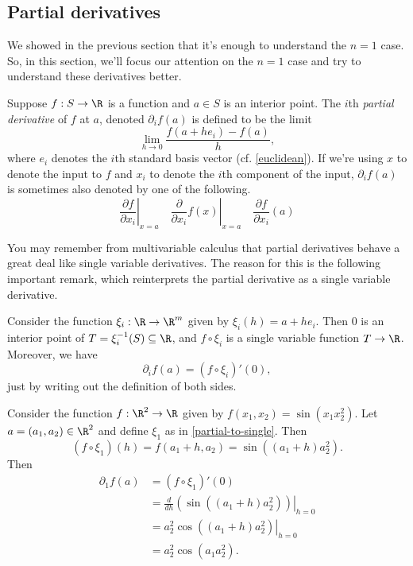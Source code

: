 \subsection{Partial derivatives}

We showed in the previous section that it's enough to understand the $n = 1$ case. So, in this section, we'll focus our attention on the $n = 1$ case and try to understand these derivatives better. 

\begin{definition}
	Suppose $f : S \to \R$ is a function and $a \in S$ is an interior point. The $i$th \emph{partial derivative} of $f$ at $a$, denoted $\partial_i f(a)$ is defined to be the limit
	\[ \lim_{h \to 0} \frac{f(a+he_i) - f(a)}{h}, \]
	where $e_i$ denotes the $i$th standard basis vector (cf. \cref{euclidean}). If we're using $x$ to denote the input to $f$ and $x_i$ to denote the $i$th component of the input, $\partial_i f(a)$ is sometimes also denoted by one of the following. 
	\[ \left. \frac{\partial f}{\partial x_i}\right|_{x = a} \quad \left.\frac{\partial}{\partial x_i} f(x)\right|_{x = a} \quad \frac{\partial f}{\partial x_i}(a) \]
\end{definition}

You may remember from multivariable calculus that partial derivatives behave a great deal like single variable derivatives. The reason for this is the following important remark, which reinterprets the partial derivative as a single variable derivative. 

\begin{remark} \label{partial-to-single}
	Consider the function $\xi_i : \R \to \R^m$ given by $\xi_i(h) = a + he_i$. Then 0 is an interior point of $T = \xi_i^{-1}(S) \subseteq \R$, and $f \circ \xi_i$ is a single variable function $T \to \R$. Moreover, we have
	\[ \partial_i f(a) = (f \circ \xi_i)'(0), \]
	just by writing out the definition of both sides. 
\end{remark}

\begin{example} \label{computing-partials-example}
	Consider the function $f : \R^2 \to \R$ given by $f(x_1, x_2) = \sin(x_1x_2^2)$. Let $a = (a_1, a_2) \in \R^2$ and define $\xi_1$ as in \cref{partial-to-single}. Then
	\[ (f \circ \xi_1)(h) = f(a_1 + h, a_2) = \sin((a_1+h)a_2^2).  \]
	Then
	\[ \begin{aligned} \partial_1 f(a) &= (f \circ \xi_1)'(0) \\
	&= \left.\frac{d}{dh} \left(\sin((a_1+h)a_2^2) \right) \right|_{h = 0} \\
	&= \left. a_2^2\cos((a_1+h)a_2^2)\right|_{h = 0} \\
	&= a_2^2\cos(a_1a_2^2). \end{aligned}  \]
\end{example}

